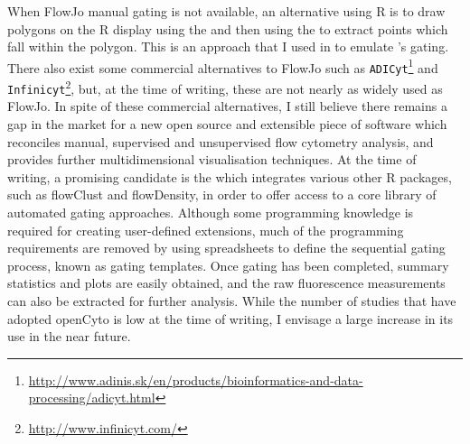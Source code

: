 When FlowJo manual gating is not available, an alternative using R is to draw polygons on the R display using the  and then using the  to extract points which fall within the polygon.
This is an approach that I used in  to emulate 's gating.
There also exist some commercial alternatives to FlowJo  such as \texttt{ADICyt}\footnote{\url{http://www.adinis.sk/en/products/bioinformatics-and-data-processing/adicyt.html}} and \texttt{Infinicyt}\footnote{\url{http://www.infinicyt.com/}}, but, at the time of writing, these are not nearly as widely used as FlowJo.
In spite of these commercial alternatives, I still believe there remains a gap in the market for a new open source and extensible piece of software which reconciles manual, supervised and unsupervised flow cytometry analysis, and provides further multidimensional visualisation techniques.
At the time of writing, a promising candidate is the  which integrates various other R packages, such as \textsf{flowClust} and \textsf{flowDensity}, in order to offer access to a core library of automated gating approaches.
Although some programming knowledge is required for creating user-defined extensions, much of the programming requirements are removed by using spreadsheets to define the sequential gating process, known as gating templates.
Once gating has been completed, summary statistics and plots are easily obtained, and the raw fluorescence measurements can also be extracted for further analysis.
While the number of studies that have adopted \textsf{openCyto} is low at the time of writing, I envisage a large increase in its use in the near future.

%

